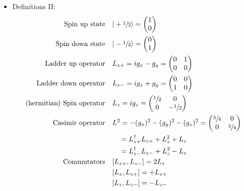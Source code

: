 \documentclass[../main.tex]{subfiles}
\begin{document}
\begin{itemize}
\item Definitions II:
\begin{align}
\text{Spin up state}  &\quad |+\sfrac{1}{2}\rangle
=\left(\begin{matrix}1\\0
\end{matrix}\right)\\
\text{Spin down state}  &\quad |-\sfrac{1}{2}\rangle
=\left(\begin{matrix}0\\1
\end{matrix}\right)\\
\text{Ladder up operator}  &\quad L_{z+}=ig_{x}-g_y=\left(\begin{matrix}0 & 1\\0 & 0
\end{matrix}\right)\\
\text{Ladder down operator}&\quad L_{z-}=ig_{x}+g_y=\left(\begin{matrix}0 & 0\\1 & 0
\end{matrix}\right)\\
\text{(hermitian) Spin operator}&\quad L_{z}=ig_z=\left(\begin{matrix}\sfrac{1}{2} & 0\\0 & -\sfrac{1}{2}
\end{matrix}\right)\\
\text{Casimir operator}&\quad L^2
=-(g_x)^2-(g_y)^2-(g_z)^2
=\left(\begin{matrix}\sfrac{3}{4} & 0\\0 & \sfrac{3}{4}
\end{matrix}\right)\\
&\qquad=L_{z+}^\dagger L_{z+}+L_z^2+L_z\\
&\qquad=L_{z-}^\dagger L_{z-}+L_z^2-L_z\\
\text{Commutators}
&\quad [L_{z+},L_{z-}]=2L_z\\
&\quad [L_{z},L_{z+}]=+L_{z+}\\
&\quad [L_{z},L_{z-}]=-L_{z-}
\end{align}


\end{itemize}
\end{document}
